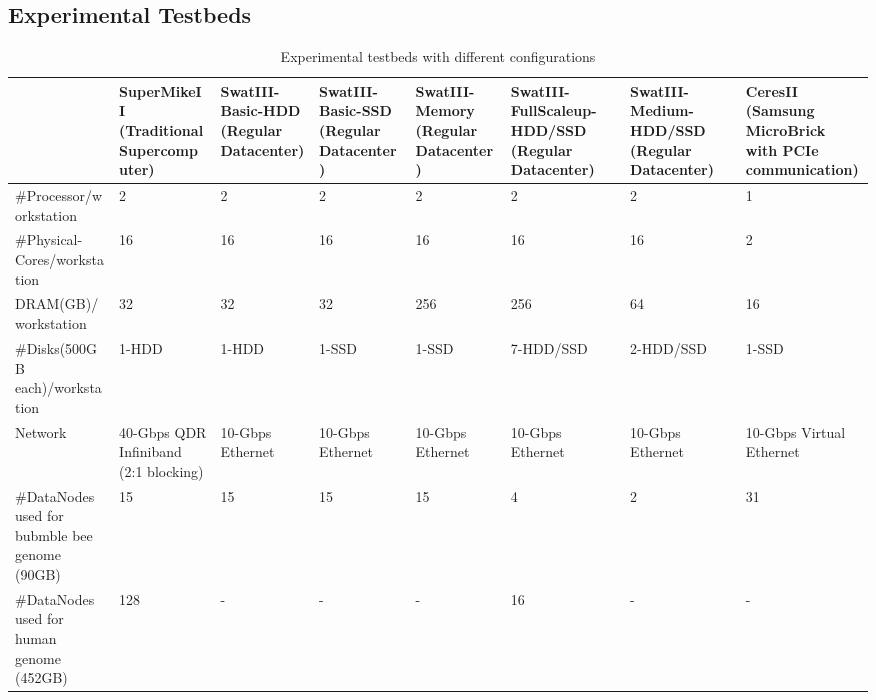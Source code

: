 \documentclass[conference]{IEEEtran}
\begin{document}
\subsection {Experimental Testbeds}
\begin{table}
\begin{center}
    \begin{tabular}{ |p{3.2cm} | p{1.6cm} | p{1.6cm} | p{1.6cm} | p{1.6cm} | p{1.6cm} | p{1.6cm}| p{1.6cm}|} \hline
    & SuperMikeII (Traditional Supercomputer) & SwatIII-Basic-HDD (Regular Datacenter) & SwatIII-Basic-SSD (Regular Datacenter)  & SwatIII-Memory (Regular Datacenter) & SwatIII-FullScaleup-HDD/SSD (Regular Datacenter) & SwatIII-Medium-HDD/SSD (Regular Datacenter) & CeresII (Samsung MicroBrick with PCIe communication) \\ \hline
    \#Processor/workstation & 2 & 2 & 2 & 2 & 2 & 2 & 1 \\ \hline
    \#Physical-Cores/workstation & 16 & 16 & 16 & 16 & 16 & 16 & 2 \\ \hline %
    DRAM(GB)/workstation & 32 & 32 & 32 & 256 & 256 & 64 & 16  \\ \hline
    \#Disks(500GB each)/workstation & 1-HDD & 1-HDD & 1-SSD & 1-SSD & 7-HDD/SSD & 2-HDD/SSD & 1-SSD \\ \hline
    Network & 40-Gbps QDR Infiniband (2:1 blocking) & 10-Gbps Ethernet & 10-Gbps Ethernet & 10-Gbps Ethernet & 10-Gbps Ethernet & 10-Gbps Ethernet & 10-Gbps Virtual Ethernet\\ \hline %
    \#DataNodes used for bubmble bee genome (90GB) & 15 & 15 & 15 & 15 & 4 & 2 & 31 \\ \hline
    \#DataNodes used for human genome (452GB)& 128 & - & - & - & 16 & - & - \\ \hline
    \end{tabular}
    \caption{Experimental testbeds with different configurations}
	\label{table:Experimentaltestbeds}
\end{center}
\end{table}
\end{document}
